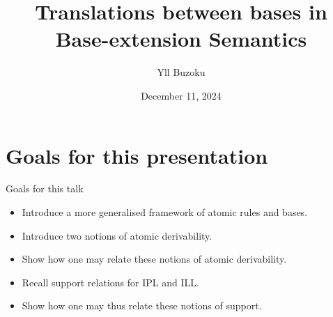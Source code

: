 \documentclass{beamer}
\title[Translations between bases in B-eS]{Translations between bases in Base-extension Semantics}
\author{Yll Buzoku}
\institute[UCL]{%
  Department of Computer Science \\ %
  University College London
}
\date{December 11, 2024}
\begin{document}
\begin{frame}
\titlepage
\end{frame}
\section*{Goals for this presentation}
\begin{frame}{Goals for this talk}
\begin{itemize}
\item Introduce a more generalised framework of atomic rules and bases.
\item Introduce two notions of atomic derivability.
\item Show how one may relate these notions of atomic derivability.
\item Recall support relations for IPL and ILL.
\item Show how one may thus relate these notions of support.
\end{itemize}
\end{frame}
\end{document}
